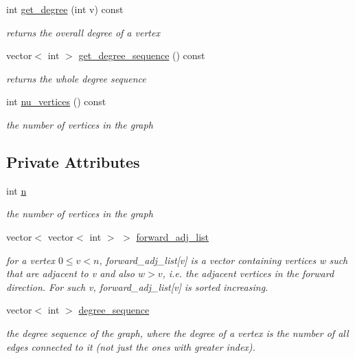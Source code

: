 \begin{DoxyCompactItemize}
int \hyperlink{classgraph_a593245054bf5ded344fbf304bcdc7fbe}{get\+\_\+degree} (int v) const
\begin{DoxyCompactList}\small\item\em returns the overall degree of a vertex \end{DoxyCompactList}\item 
vector$<$ int $>$ \hyperlink{classgraph_afdca627df7fb93a7d1d8a547f616e948}{get\+\_\+degree\+\_\+sequence} () const
\begin{DoxyCompactList}\small\item\em returns the whole degree sequence \end{DoxyCompactList}\item 
int \hyperlink{classgraph_a70a6e0e4e0a874ab122405abd38f83cd}{nu\+\_\+vertices} () const
\begin{DoxyCompactList}\small\item\em the number of vertices in the graph \end{DoxyCompactList}\end{DoxyCompactItemize}
\subsection*{Private Attributes}
\begin{DoxyCompactItemize}
\item 
int \hyperlink{classgraph_ac8b3474ce95c04087c312508ec1443b6}{n}
\begin{DoxyCompactList}\small\item\em the number of vertices in the graph \end{DoxyCompactList}\item 
vector$<$ vector$<$ int $>$ $>$ \hyperlink{classgraph_a7d6441850d586d6a99fb73df57b70362}{forward\+\_\+adj\+\_\+list}
\begin{DoxyCompactList}\small\item\em for a vertex $0 \leq v < n$, forward\+\_\+adj\+\_\+list\mbox{[}v\mbox{]} is a vector containing vertices w such that are adjacent to v and also $w > v$, i.\+e. the adjacent vertices in the forward direction. For such v, forward\+\_\+adj\+\_\+list\mbox{[}v\mbox{]} is sorted increasing. \end{DoxyCompactList}\item 
vector$<$ int $>$ \hyperlink{classgraph_a0b31295672bfe37669c9eb3640977fe6}{degree\+\_\+sequence}
\begin{DoxyCompactList}\small\item\em the degree sequence of the graph, where the degree of a vertex is the number of all edges connected to it (not just the ones with greater index). \end{DoxyCompactList}\end{DoxyCompactItemize}
